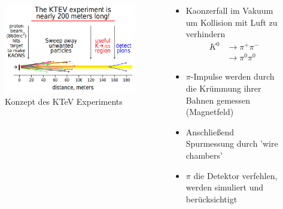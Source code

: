 \documentclass[aspectratio=1610, professionalfonts, 9pt, t]{beamer}
\begin{document}
  \begin{frame}
    \begin{columns}[onlytextwidth]
      \begin{column}{0.4\textwidth}
        \begin{figure}[ht]
          \begin{center}
            \includegraphics[height=0.6\textheight]{Images/ktevdistance.png} %
            \caption{Konzept des KTeV Experiments}
          \end{center}
        \end{figure}
      \end{column}
      \begin{column}{0.5\textwidth}
        \begin{itemize}
          \item Kaonzerfall im Vakuum um Kollision mit Luft zu verhindern
          \begin{align*}
            K^0 &\rightarrow \pi^+ \pi^- \\
                &\rightarrow \pi^0 \pi^0
          \end{align*}
          \item $\pi$-Impulse werden durch die Krümmung ihrer Bahnen gemessen (Magnetfeld)
          \item Anschließend Spurmessung durch 'wire chambers'
          \item $\pi$ die Detektor verfehlen, werden simuliert und berücksichtigt
        \end{itemize}
      \end{column}
    \end{columns}
  \end{frame}
\end{document}
